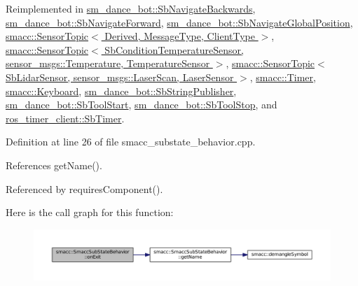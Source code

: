Reimplemented in \hyperlink{classsm__dance__bot_1_1SbNavigateBackwards_a03c693e0b3cbf8157cc8783f2c94426c}{sm\+\_\+dance\+\_\+bot\+::\+Sb\+Navigate\+Backwards}, \hyperlink{classsm__dance__bot_1_1SbNavigateForward_a0d61710d752b2e6f07bc2a33a67c19d0}{sm\+\_\+dance\+\_\+bot\+::\+Sb\+Navigate\+Forward}, \hyperlink{classsm__dance__bot_1_1SbNavigateGlobalPosition_a7120a2dd1f6e53558b0c70ec6b02a804}{sm\+\_\+dance\+\_\+bot\+::\+Sb\+Navigate\+Global\+Position}, \hyperlink{classsmacc_1_1SensorTopic_a07256412cede49676b38cfd5b5aa1ce3}{smacc\+::\+Sensor\+Topic$<$ Derived, Message\+Type, Client\+Type $>$}, \hyperlink{classsmacc_1_1SensorTopic_a07256412cede49676b38cfd5b5aa1ce3}{smacc\+::\+Sensor\+Topic$<$ Sb\+Condition\+Temperature\+Sensor, sensor\+\_\+msgs\+::\+Temperature, Temperature\+Sensor $>$}, \hyperlink{classsmacc_1_1SensorTopic_a07256412cede49676b38cfd5b5aa1ce3}{smacc\+::\+Sensor\+Topic$<$ Sb\+Lidar\+Sensor, sensor\+\_\+msgs\+::\+Laser\+Scan, Laser\+Sensor $>$}, \hyperlink{classsmacc_1_1Timer_a5b207b96df3c5a698706da5cde0c711a}{smacc\+::\+Timer}, \hyperlink{classsmacc_1_1Keyboard_ac832f7e65635a48e20a72290933a647f}{smacc\+::\+Keyboard}, \hyperlink{classsm__dance__bot_1_1SbStringPublisher_ac98b1befbcf67d2e7c175faec5fcd2d5}{sm\+\_\+dance\+\_\+bot\+::\+Sb\+String\+Publisher}, \hyperlink{classsm__dance__bot_1_1SbToolStart_a9d01fb5bcc2df69f210f05398e415fc2}{sm\+\_\+dance\+\_\+bot\+::\+Sb\+Tool\+Start}, \hyperlink{classsm__dance__bot_1_1SbToolStop_a1bcdd7b95398f6805a333f35c5870c07}{sm\+\_\+dance\+\_\+bot\+::\+Sb\+Tool\+Stop}, and \hyperlink{classros__timer__client_1_1SbTimer_a463a339b45532ec18ea86cc2a849bf45}{ros\+\_\+timer\+\_\+client\+::\+Sb\+Timer}.



Definition at line 26 of file smacc\+\_\+substate\+\_\+behavior.\+cpp.



References get\+Name().



Referenced by requires\+Component().




Here is the call graph for this function\+:
\nopagebreak
\begin{figure}[H]
\begin{center}
\leavevmode
\includegraphics[width=350pt]{classsmacc_1_1SmaccSubStateBehavior_afaeb44666136c5ae47a53dde89fa5d31_cgraph}
\end{center}
\end{figure}




